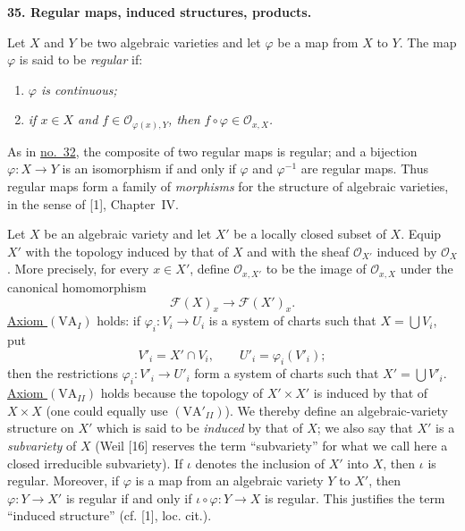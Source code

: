 
\medskip
{}\label{fac:II:1:no:35}
\textbf{35. Regular maps, induced structures, products.}

\label{fac:II:1:no:35:def:regular}
Let $X$ and $Y$ be two algebraic varieties and let $\varphi$ be a map from $X$ to $Y$. The map $\varphi$ is said to be \textit{regular} if:

\begin{enumerate}[label=(\alph*),leftmargin=2.5em]
\item{}\label{fac:II:1:no:35:def:regular:item:a} \textit{$\varphi$ is continuous;}
\item{}\label{fac:II:1:no:35:def:regular:item:b} \textit{if $x\in X$ and $f\in\mathcal{O}_{\varphi(x),Y}$, then $f\circ\varphi\in\mathcal{O}_{x,X}$.}
\end{enumerate}

As in \hyperref[fac:II:1:no:32]{no.~32}, the composite of two regular maps is regular; and a bijection $\varphi:X\to Y$ is an isomorphism if and only if $\varphi$ and $\varphi^{-1}$ are regular maps. Thus regular maps form a family of \textit{morphisms} for the structure of algebraic varieties, in the sense of [1], Chapter~IV.

Let $X$ be an algebraic variety and let $X'$ be a locally closed subset of $X$. Equip $X'$ with the topology induced by that of $X$ and with the sheaf $\mathcal{O}_{X'}$ induced by $\mathcal{O}_X$. More precisely, for every $x\in X'$, define $\mathcal{O}_{x,X'}$ to be the image of $\mathcal{O}_{x,X}$ under the canonical homomorphism
\[
\mathcal{F}(X)_x\longrightarrow\mathcal{F}(X')_x.
\]
\hyperref[fac:II:1:no:34:axiom:VA-I]{Axiom $(\mathrm{VA}_I)$} holds: if $\varphi_i:V_i\to U_i$ is a system of charts such that $X=\bigcup V_i$, put
\[
V'_i=X'\cap V_i,\qquad U'_i=\varphi_i(V'_i);
\]
then the restrictions $\varphi_i:V'_i\to U'_i$ form a system of charts such that $X'=\bigcup V'_i$. \hyperref[fac:II:1:no:34:axiom:VA-II]{Axiom $(\mathrm{VA}_{II})$} holds because the topology of $X'\times X'$ is induced by that of $X\times X$ (one could equally use \hyperref[fac:II:1:no:34:axiom:VA-II-prime]{$(\mathrm{VA}'_{II})$}). We thereby define an algebraic-variety structure on $X'$ which is said to be \textit{induced} by that of $X$; we also say that $X'$ is a \textit{subvariety} of $X$ (Weil [16] reserves the term ``subvariety'' for what we call here a closed irreducible subvariety). If $\iota$ denotes the inclusion of $X'$ into $X$, then $\iota$ is regular. Moreover, if $\varphi$ is a map from an algebraic variety $Y$ to $X'$, then $\varphi:Y\to X'$ is regular if and only if $\iota\circ\varphi:Y\to X$ is regular. This justifies the term ``induced structure'' (cf. [1], loc. cit.).

